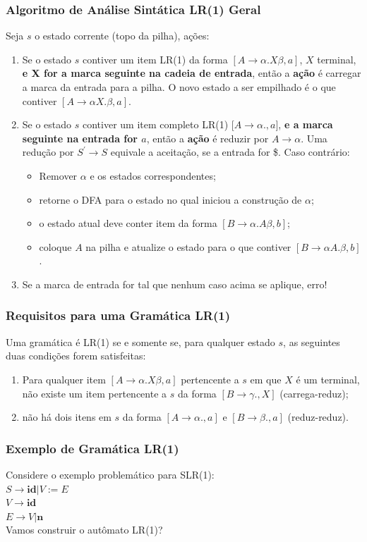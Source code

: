 \documentclass[table]{beamer}
\begin{document}
\begin{frame}
   \frametitle{Algoritmo de Análise Sintática LR(1) Geral}
   Seja $s$ o estado corrente (topo da pilha), ações:
   \begin{enumerate}
      \item Se o estado $s$ contiver um item LR(1) da forma $[A\to\alpha.X\beta, a]$, $X$ terminal, \textbf{e X for a marca seguinte na cadeia de entrada}, então a \textbf{ação} é carregar a marca da entrada para a pilha. O novo estado a ser empilhado é o que contiver $[A\to\alpha X.\beta,a]$.
      \item Se o estado $s$ contiver um item completo LR(1) [$A\to\alpha.,a]$, \textbf{e a marca seguinte na entrada for $a$}, então a \textbf{ação} é reduzir por $A\to\alpha$. Uma redução por $S^{'}\to S$ equivale a aceitação, se a entrada for \$. Caso contrário:
      \begin{itemize}
         \item Remover $\alpha$ e os estados correspondentes;
	 \item retorne o DFA para o estado no qual iniciou a construção de $\alpha$;
	 \item o estado atual deve conter item da forma $[B\to\alpha.A\beta, b]$;
	 \item coloque $A$ na pilha e atualize o estado para o que contiver $[B\to\alpha A.\beta, b]$.
      \end{itemize}
      \item Se a marca de entrada for tal que nenhum caso acima se aplique, erro!
   \end{enumerate}
\end{frame}

\begin{frame}
   \frametitle{Requisitos para uma Gramática LR(1)}
   Uma gramática é LR(1) se e somente se, para qualquer estado $s$, as seguintes duas condições forem satisfeitas:
   \begin{enumerate}
      \item Para qualquer item $[A\to\alpha.X\beta, a]$ pertencente a $s$ em que $X$ é um terminal, não existe um item pertencente a $s$ da forma $[B\to\gamma.,X]$ (carrega-reduz);
      \item não há dois itens em $s$ da forma $[A\to\alpha.,a]$ e $[B\to\beta., a]$ (reduz-reduz).
   \end{enumerate}
\end{frame}

\begin{frame}
   \frametitle{Exemplo de Gramática LR(1)}
   Considere o exemplo problemático para SLR(1): \\
   $S \to \textbf{id}|V:=E$ \\
   $V \to \textbf{id}$ \\
   $E \to V|\textbf{n}$ \\
   Vamos construir o autômato LR(1)?
\end{frame}
\end{document}
